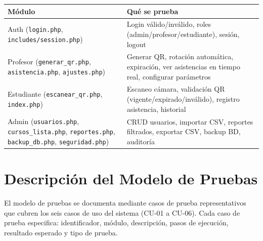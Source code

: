 \documentclass[12pt, letterpaper, oneside]{report}
\begin{document}
\begin{center}
\small
\begin{tabularx}{\textwidth}{|p{5cm}|X|}
\hline
\textbf{M\'odulo} & \textbf{Qu\'e se prueba} \\
\hline
Auth (\texttt{login.php}, \texttt{includes/session.php}) & Login v\'alido/inv\'alido, roles (admin/profesor/estudiante), sesi\'on, logout \\
\hline
Profesor (\texttt{generar\_qr.php}, \texttt{asistencia.php}, \texttt{ajustes.php}) & Generar QR, rotaci\'on autom\'atica, expiraci\'on, ver asistencias en tiempo real, configurar par\'ametros \\
\hline
Estudiante (\texttt{escanear\_qr.php}, \texttt{index.php}) & Escaneo c\'amara, validaci\'on QR (vigente/expirado/inv\'alido), registro asistencia, historial \\
\hline
Admin (\texttt{usuarios.php}, \texttt{cursos\_lista.php}, \texttt{reportes.php}, \texttt{backup\_db.php}, \texttt{seguridad.php}) & CRUD usuarios, importar CSV, reportes filtrados, exportar CSV, backup BD, auditor\'ia \\
\hline
\end{tabularx}
\end{center}

\section{Descripción del Modelo de Pruebas}

El modelo de pruebas se documenta mediante casos de prueba representativos que cubren los seis casos de uso del sistema (CU-01 a CU-06). Cada caso de prueba especifica: identificador, módulo, descripción, pasos de ejecución, resultado esperado y tipo de prueba.
\end{document}
